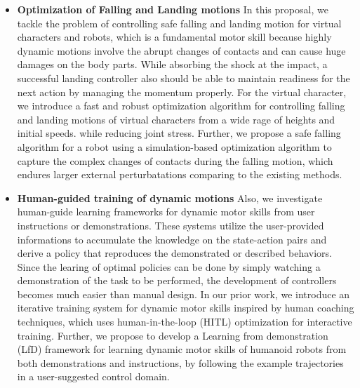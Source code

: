 \begin{itemize}
\item 
  \textbf{Optimization of Falling and Landing motions}
  In this proposal, we tackle the problem of controlling safe falling 
  and landing motion for virtual characters and robots, which is a fundamental
  motor skill because highly dynamic motions involve the abrupt changes
  of contacts and can cause huge damages on the body parts.
  While absorbing the shock at the impact, a successful landing controller 
  also should be able to maintain readiness for the next action by managing
  the momentum properly.
  For the virtual character, we introduce a fast and robust optimization 
  algorithm for controlling falling and landing motions of virtual
  characters from a wide rage of heights and initial speeds.
  while reducing joint stress.
  Further, we propose a safe falling algorithm for a robot using
  a simulation-based optimization algorithm to capture the complex
  changes of contacts during the falling motion, which endures larger 
  external perturbatations comparing to the existing methods.
\item 
  \textbf{Human-guided training of dynamic motions}
  Also, we investigate human-guide learning frameworks for dynamic
  motor skills from user instructions or demonstrations.
  These systems utilize the user-provided informations to
  accumulate the knowledge on the state-action pairs and derive
  a policy that reproduces the demonstrated or described behaviors.
  Since the learing of optimal policies can be done by simply
  watching a demonstration of the task to be performed,
  the development of controllers becomes much easier 
  than manual design.
  In our prior work, we introduce an iterative training system for dynamic
  motor skills inspired by human coaching techniques, which uses 
  human-in-the-loop (HITL) optimization for interactive training.  
  Further, we propose to develop a Learning from demonstration (LfD)
  framework for learning  dynamic motor skills of humanoid robots 
  from both demonstrations and instructions, by following 
  the example trajectories in a user-suggested control domain.

\end{itemize}
